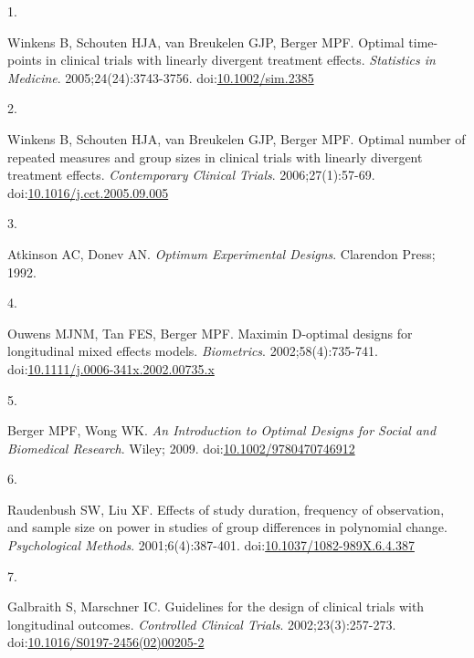 \documentclass[
  11pt,
]{article}
\newlength{\cslhangindent}
\newlength{\csllabelwidth}
\newenvironment{CSLReferences}[2] %
 {\begin{list}{}{%
  \setlength{\itemindent}{0pt}
  \setlength{\leftmargin}{0pt}
  \setlength{\parsep}{0pt}
  \ifodd #1
   \setlength{\leftmargin}{\cslhangindent}
   \setlength{\itemindent}{-1\cslhangindent}
  \fi
  \setlength{\itemsep}{#2\baselineskip}}}
 {\end{list}}
\newcommand{\CSLLeftMargin}[1]{\parbox[t]{\csllabelwidth}{\strut#1\strut}}
\newcommand{\CSLRightInline}[1]{\parbox[t]{\linewidth - \csllabelwidth}{\strut#1\strut}}
\begin{document}
\protect{}\label{refs}
\begin{CSLReferences}{0}{1}
\CSLLeftMargin{1. }%
\CSLRightInline{{Winkens B, Schouten HJA, van Breukelen GJP, Berger MPF}. Optimal time-points in clinical trials with linearly divergent treatment effects. \emph{Statistics in Medicine}. 2005;24(24):3743-3756. doi:\href{https://doi.org/10.1002/sim.2385}{10.1002/sim.2385}}

\CSLLeftMargin{2. }%
\CSLRightInline{{Winkens B, Schouten HJA, van Breukelen GJP, Berger MPF}. Optimal number of repeated measures and group sizes in clinical trials with linearly divergent treatment effects. \emph{Contemporary Clinical Trials}. 2006;27(1):57-69. doi:\href{https://doi.org/10.1016/j.cct.2005.09.005}{10.1016/j.cct.2005.09.005}}

\CSLLeftMargin{3. }%
\CSLRightInline{Atkinson AC, Donev AN. \emph{Optimum Experimental Designs}. Clarendon Press; 1992.}

\CSLLeftMargin{4. }%
\CSLRightInline{Ouwens MJNM, Tan FES, Berger MPF. Maximin {D}-optimal designs for longitudinal mixed effects models. \emph{Biometrics}. 2002;58(4):735-741. doi:\href{https://doi.org/10.1111/j.0006-341x.2002.00735.x}{10.1111/j.0006-341x.2002.00735.x}}

\CSLLeftMargin{5. }%
\CSLRightInline{Berger MPF, Wong WK. \emph{An Introduction to Optimal Designs for Social and Biomedical Research}. Wiley; 2009. doi:\href{https://doi.org/10.1002/9780470746912}{10.1002/9780470746912}}

\CSLLeftMargin{6. }%
\CSLRightInline{Raudenbush SW, Liu XF. Effects of study duration, frequency of observation, and sample size on power in studies of group differences in polynomial change. \emph{Psychological Methods}. 2001;6(4):387-401. doi:\href{https://doi.org/10.1037/1082-989X.6.4.387}{10.1037/1082-989X.6.4.387}}

\CSLLeftMargin{7. }%
\CSLRightInline{Galbraith S, Marschner IC. Guidelines for the design of clinical trials with longitudinal outcomes. \emph{Controlled Clinical Trials}. 2002;23(3):257-273. doi:\href{https://doi.org/10.1016/S0197-2456(02)00205-2}{10.1016/S0197-2456(02)00205-2}}


\end{CSLReferences}
\end{document}
